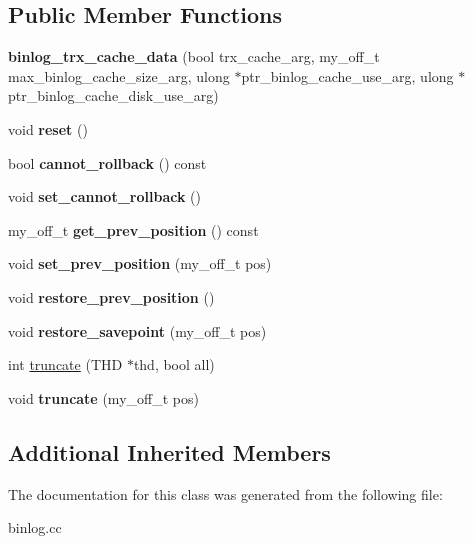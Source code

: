 \subsection*{Public Member Functions}
\begin{DoxyCompactItemize}
\item 
\mbox{\label{classbinlog__trx__cache__data_acc4c214e46a9aa0925ec19a5e0c76051}} 
{\bfseries binlog\+\_\+trx\+\_\+cache\+\_\+data} (bool trx\+\_\+cache\+\_\+arg, my\+\_\+off\+\_\+t max\+\_\+binlog\+\_\+cache\+\_\+size\+\_\+arg, ulong $\ast$ptr\+\_\+binlog\+\_\+cache\+\_\+use\+\_\+arg, ulong $\ast$ptr\+\_\+binlog\+\_\+cache\+\_\+disk\+\_\+use\+\_\+arg)
\item 
\mbox{\label{classbinlog__trx__cache__data_ae066439b662e060299d776d6a0cefeec}} 
void {\bfseries reset} ()
\item 
\mbox{\label{classbinlog__trx__cache__data_a969544a2e3b413e28e044efeb6363760}} 
bool {\bfseries cannot\+\_\+rollback} () const
\item 
\mbox{\label{classbinlog__trx__cache__data_a040be1a8a16d4b66cc049552b3bf8ff7}} 
void {\bfseries set\+\_\+cannot\+\_\+rollback} ()
\item 
\mbox{\label{classbinlog__trx__cache__data_aebf1d8bad8eb6a290da179e6d570bf74}} 
my\+\_\+off\+\_\+t {\bfseries get\+\_\+prev\+\_\+position} () const
\item 
\mbox{\label{classbinlog__trx__cache__data_a760b8c91fc9277200ee8888516e4c65c}} 
void {\bfseries set\+\_\+prev\+\_\+position} (my\+\_\+off\+\_\+t pos)
\item 
\mbox{\label{classbinlog__trx__cache__data_a6171beb07c57f879c138b15382fc4aa8}} 
void {\bfseries restore\+\_\+prev\+\_\+position} ()
\item 
\mbox{\label{classbinlog__trx__cache__data_a17c0371a1f0a6e1cb3effb7f7549c45f}} 
void {\bfseries restore\+\_\+savepoint} (my\+\_\+off\+\_\+t pos)
\item 
int \mbox{\hyperlink{group__Binary__Log_gae0d03425fee2a702a9b4dfac7b9de4b1}{truncate}} (T\+HD $\ast$thd, bool all)
\item 
\mbox{\label{classbinlog__trx__cache__data_af085a04763bdae99acbcb1d01b54d393}} 
void {\bfseries truncate} (my\+\_\+off\+\_\+t pos)
\end{DoxyCompactItemize}
\subsection*{Additional Inherited Members}


The documentation for this class was generated from the following file\+:\begin{DoxyCompactItemize}
\item 
binlog.\+cc\end{DoxyCompactItemize}
